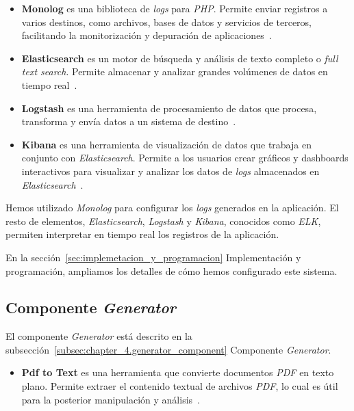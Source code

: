 \begin{itemize}
    \item
    \textbf{Monolog} es una biblioteca de \textit{logs} para \textit{PHP}.
    Permite enviar registros a varios destinos, como archivos, bases de datos y servicios de terceros, facilitando la
    monitorización y depuración de aplicaciones~\cite{url_monolog}.

    \item \textbf{Elasticsearch} es un motor de búsqueda y análisis de texto completo o \textit{full text search}.
    Permite almacenar y analizar grandes volúmenes de datos en tiempo real~\cite{url_elasticsearch}.

    \item \textbf{Logstash} es una herramienta de procesamiento de datos que procesa, transforma y envía datos a un
    sistema de destino~\cite{url_logstash}.

    \item \textbf{Kibana} es una herramienta de visualización de datos que trabaja en conjunto con
    \textit{Elasticsearch}.
    Permite a los usuarios crear gráficos y dashboards interactivos para visualizar y analizar los datos de
    \textit{logs} almacenados en \textit{Elasticsearch}~\cite{url_kibana}.
\end{itemize}

Hemos utilizado \textit{Monolog} para configurar los \textit{logs} generados en la aplicación.
El resto de elementos, \textit{Elasticsearch}, \textit{Logstash} y \textit{Kibana}, conocidos como \textit{ELK},
permiten interpretar en tiempo real los registros de la aplicación.

En la sección~\ref{sec:implemetacion_y_programacion} Implementación y programación, ampliamos los detalles de cómo
hemos configurado este sistema.

\subsection*{Componente \textit{Generator}}

El componente \textit{Generator} está descrito en la subsección~\ref{subsec:chapter_4.generator_component} Componente
\textit{Generator}.

\begin{itemize}
    \item
    \textbf{Pdf to Text} es una herramienta que convierte documentos \textit{PDF} en texto plano.
    Permite extraer el contenido textual de archivos \textit{PDF}, lo cual es útil para la posterior manipulación y
    análisis~\cite{url_pdftotextl}.
\end{itemize}

